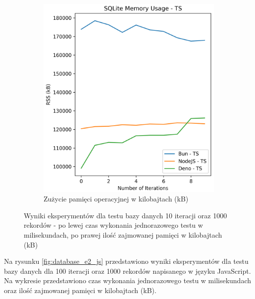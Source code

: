 \begin{figure}[H]
\begin{subfigure}[b]{0.4\textwidth}
    \centering
    \includegraphics[width=\textwidth]{Figures/database/sqlite_10_1000_ts_memory.png}
    \caption{Zużycie pamięci operacyjnej w kilobajtach (kB)}
    \label{fig:database_e1_ts_memory}
  \end{subfigure}
  \caption{Wyniki eksperymentów dla testu bazy danych 10 iteracji oraz 1000 rekordów - po lewej czas wykonania jednorazowego testu w milisekundach, po prawej ilość zajmowanej pamięci w kilobajtach (kB)}
  \label{fig:database_e1_ts}
\end{figure}

Na rysunku \ref{fig:database_e2_js} przedstawiono wyniki eksperymentów dla testu bazy danych dla 100 iteracji oraz 1000 rekordów napisanego w języku JavaScript. Na wykresie przedstawiono czas wykonania jednorazowego testu w milisekundach oraz ilość zajmowanej pamięci w kilobajtach (kB).

